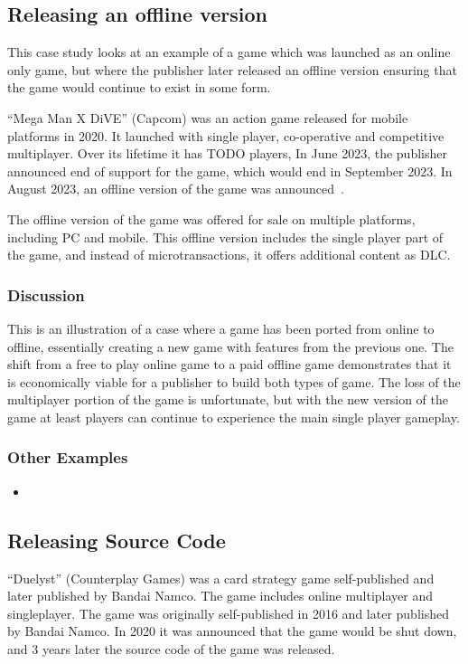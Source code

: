 \subsection{Releasing an offline version}
This case study looks at an example of a game which was launched as an online only game,
but where the publisher later released an offline version ensuring that the game would continue to exist in some form.

``Mega Man X DiVE'' (Capcom) was an action game released for mobile platforms in 2020.
It launched with single player, co-operative and competitive multiplayer.
Over its lifetime it has TODO players\cn,
In June 2023, the publisher announced end of support for the game, which would end in September 2023\cite{megaman-eos-2023}.
In August 2023, an offline version of the game was announced~\cite{megaman-offline}.

The offline version of the game was offered for sale on multiple platforms, including PC and mobile.
This offline version includes the single player part of the game, and instead of microtransactions, it offers additional content as DLC.

\subsubsection*{Discussion}
This is an illustration of a case where a game has been ported from online to offline, essentially creating a new game with features from the previous one.
The shift from a free to play online game to a paid offline game demonstrates that it is economically viable for a publisher to build both types of game.
The loss of the multiplayer portion of the game is unfortunate, but with the new version of the game at least players can continue to experience the main single player gameplay.

\subsubsection*{Other Examples}
\begin{itemize}
    \item
\end{itemize}

\subsection{Releasing Source Code}
``Duelyst'' (Counterplay Games) was a card strategy game self-published and later published by Bandai Namco.
The game includes online multiplayer and singleplayer.
The game was originally self-published in 2016 and later published by Bandai Namco.
In 2020 it was announced that the game would be shut down,
and 3 years later the source code of the game was released\cite{duelyst-2023}.

